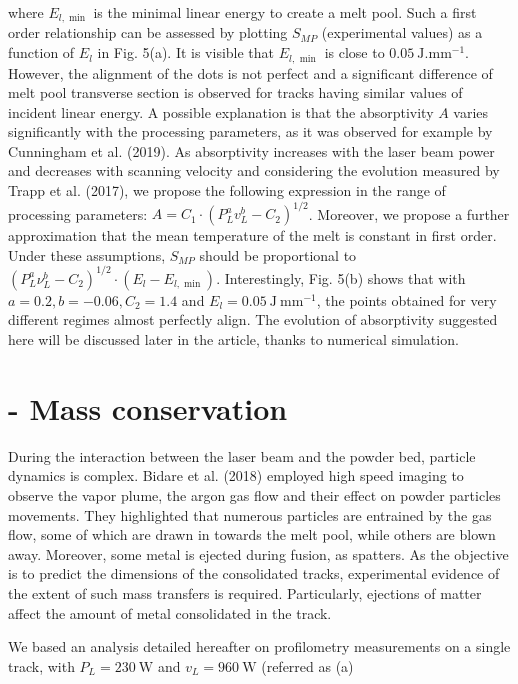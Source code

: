 \documentclass[10pt]{article}
\begin{document}
where $E_{l, \min }$ is the minimal linear energy to create a melt pool. Such a first order relationship can be assessed by plotting $S_{M P}$ (experimental values) as a function of $E_{l}$ in Fig. 5(a). It is visible that $E_{l, \text { min }}$ is close to $0.05 \mathrm{~J} . \mathrm{mm}^{-1}$. However, the alignment of the dots is not perfect and a significant difference of melt pool transverse section is observed for tracks having similar values of incident linear energy. A possible explanation is that the absorptivity $A$ varies significantly with the processing parameters, as it was observed for example by Cunningham et al. (2019). As absorptivity increases with the laser beam power and decreases with scanning velocity and considering the evolution measured by Trapp et al. (2017), we propose the following expression in the range of processing parameters: $A=C_{1} \cdot\left(P_{L}^{a} v_{L}^{b}-C_{2}\right)^{1 / 2}$. Moreover, we propose a further approximation that the mean temperature of the melt is constant in first order. Under these assumptions, $S_{M P}$ should be proportional to $\left(P_{L}^{a} \nu_{L}^{b}-C_{2}\right)^{1 / 2} \cdot\left(E_{l}-E_{l, \min }\right)$. Interestingly, Fig. 5(b) shows that with $a=0.2, b=-0.06, C_{2}=1.4$ and $E_{l}=0.05 \mathrm{~J} \mathrm{~mm}^{-1}$, the points obtained for very different regimes almost perfectly align. The evolution of absorptivity suggested here will be discussed later in the article, thanks to numerical simulation.

\section*{- Mass conservation}
During the interaction between the laser beam and the powder bed, particle dynamics is complex. Bidare et al. (2018) employed high speed imaging to observe the vapor plume, the argon gas flow and their effect on powder particles movements. They highlighted that numerous particles are entrained by the gas flow, some of which are drawn in towards the melt pool, while others are blown away. Moreover, some metal is ejected during fusion, as spatters. As the objective is to predict the dimensions of the consolidated tracks, experimental evidence of the extent of such mass transfers is required. Particularly, ejections of matter affect the amount of metal consolidated in the track.

We based an analysis detailed hereafter on profilometry measurements on a single track, with $P_{L}=230 \mathrm{~W}$ and $v_{L}=960 \mathrm{~W}$ (referred as (a)
\end{document}

